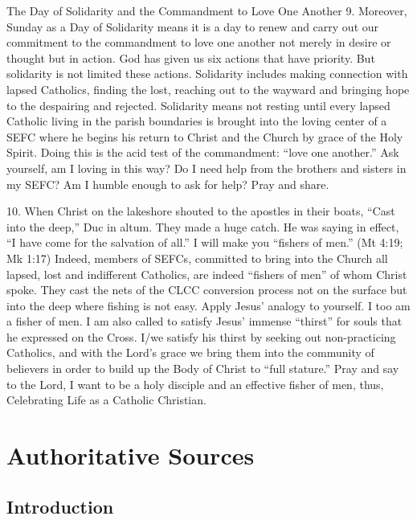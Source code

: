 \documentclass[oneside]{book}
\begin{document}
The Day of Solidarity and the Commandment to Love One Another
9. Moreover, Sunday as a Day of Solidarity means it is a day to renew and carry
out our commitment to the commandment to love one another not merely in desire
or thought but in action. God has given us six actions that have priority. But
solidarity is not limited these actions. Solidarity includes making connection
with lapsed Catholics, finding the lost, reaching out to the wayward and
bringing hope to the despairing and rejected. Solidarity means not resting until
every lapsed Catholic living in the parish boundaries is brought into the loving
center of a SEFC where he begins his return to Christ and the Church by grace of
the Holy Spirit. Doing this is the acid test of the commandment: ``love one
another.'' Ask yourself, am I loving in this way? Do I need help from the
brothers and sisters in my SEFC? Am I humble enough to ask for help? Pray and
share.

10. When Christ on the lakeshore shouted to the apostles in their boats, ``Cast
into the deep,'' Duc in altum. They made a huge catch. He was saying in effect,
``I have come for the salvation of all.'' I will make you ``fishers of men.''
(Mt 4:19; Mk 1:17) Indeed, members of SEFCs, committed to bring into the Church
all lapsed, lost and indifferent Catholics, are indeed ``fishers of men'' of
whom Christ spoke. They cast the nets of the CLCC conversion process not on the
surface but into the deep where fishing is not easy. Apply Jesus' analogy to
yourself. I too am a fisher of men. I am also called to satisfy Jesus' immense
``thirst'' for souls that he expressed on the Cross. I/we satisfy his thirst by
seeking out non-practicing Catholics, and with the Lord's grace we bring them
into the community of believers in order to build up the Body of Christ to
``full stature.'' Pray and say to the Lord, I want to be a holy disciple and an
effective fisher of men, thus, Celebrating Life as a Catholic Christian.


\part{Authoritative Sources}


\chapter{Introduction}
\end{document}
